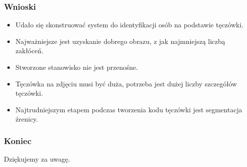 \documentclass{beamer}
\begin{document}

\begin{frame}
\frametitle{Wnioski}
\begin{itemize}
\item Udało się skonstruować system do identyfikacji osób na podstawie tęczówki.
\item Najważniejsze jest uzyskanie dobrego obrazu, z jak najmniejszą liczbą zakłóceń.
\item Stworzone stanowisko nie jest przenośne.
\item Tęczówka na zdjęciu musi być duża, potrzeba jest dużej liczby szczegółów tęczówki.
\item Najtrudniejszym etapem podczas tworzenia kodu tęczówki jest segmentacja źrenicy.
\end{itemize}
\end{frame}

\begin{frame}
\frametitle{Koniec}

\begin{block}{}
\centering
Dziękujemy za uwagę.
\end{block}

\end{frame}

\end{document}
